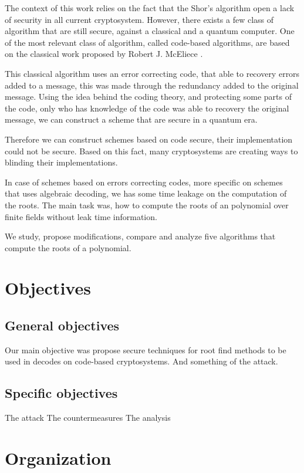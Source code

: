 The context of this work relies on the fact that the Shor's algorithm open a lack of security in all current cryptosystem. However, there exists a few class of algorithm that are still secure, against a classical and a quantum computer. One of the most relevant class of algorithm, called code-based algorithms, are based on the classical work proposed by Robert J. McEliece \cite{mceliece1978public}. 

This classical algorithm uses an error correcting code, that able to recovery errors added to a message, this was made through the redundancy added to the original message. Using the idea behind the coding theory, and protecting some parts of the code, only who has knowledge of the code was able to recovery the original message, we can construct a scheme that are secure in a quantum era.

Therefore we can construct schemes based on code secure, their implementation could not be secure. Based on this fact, many cryptosystems are creating ways to blinding their implementations. 

In case of schemes based on errors correcting codes, more specific on schemes that uses algebraic decoding, we has some time leakage on the computation of the roots. The main task was, how to compute the roots of an polynomial over finite fields without leak time information. 

We study, propose modifications, compare and analyze five algorithms that compute the roots of a polynomial.


\section{Objectives}

\subsection{General objectives}
Our main objective was propose secure techniques for root find methods to be used in decodes on code-based cryptosystems. And something of the attack.
\subsection{Specific objectives}
The attack
The countermeasures
The analysis
\section{Organization}
